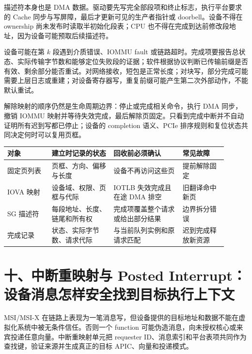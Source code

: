 描述符本身也是 DMA 数据。驱动要先写完全部段项和终止标志，执行平台要求的 Cache 同步与写屏障，最后才更新可见的生产者指针或 doorbell。设备不得在 ownership 尚未发布时读取半初始化段表；CPU 也不得在完成到达前修改段地址，因为设备可能预取后续描述符。


设备可能在第 $k$ 段遇到介质错误、IOMMU fault 或链路超时。完成项要报告总状态、实际传输字节数和能够定位失败段的证据；软件根据协议判断已传输前缀是否有效、剩余部分能否重试。对网络接收，短包是正常长度；对块写，部分完成可能需要上层日志或重建；对设备寄存器写，重复前缀可能产生第二次外部动作，不能默认重试。

解除映射的顺序仍然是生命周期边界：停止或完成相关命令，执行 DMA 同步，撤销 IOMMU 映射并等待失效完成，最后解除页固定。只看到完成中断并不自动证明所有迟到写都已停止；设备的 completion 语义、PCIe 排序规则和复位状态共同决定何时可以复用页框。

\begin{longtable}{L{0.18\linewidth}L{0.25\linewidth}L{0.29\linewidth}L{0.18\linewidth}}
\toprule
对象 & 建立时记录的状态 & 回收前必须确认 & 常见故障 \\
\midrule
固定页列表 & 页框、方向、偏移与长度 & 设备不再访问这些页 & 提前解除固定 \\\tablerowrule
IOVA 映射 & 设备域、权限、页框与代际 & IOTLB 失效完成且在途 DMA 排空 & 旧翻译命中新页 \\\tablerowrule
SG 描述符 & 每段地址、长度、链尾和所有权 & 完成项覆盖整个请求或给出部分结果 & 边界拆分错误 \\\tablerowrule
完成记录 & 状态、实际字节数、请求代际 & 与当前队列实例和原请求匹配 & 迟到完成释放新资源 \\
\bottomrule
\end{longtable}

\section{十、中断重映射与 Posted Interrupt：设备消息怎样安全找到目标执行上下文}

MSI/MSI-X 在链路上表现为一笔消息写，但设备提供的目标地址和数据不能在虚拟化系统中被无条件信任。否则一个 function 可能伪造消息，向未授权核心或来宾投递任意向量。中断重映射单元把 requester ID、消息索引和平台表项共同作为查找键，验证来源并生成真正的目标 APIC、向量和投递模式。

